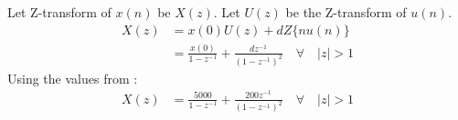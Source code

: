 \documentclass[journal,12pt,twocolumn]{IEEEtran}
\theoremstyle{remark}
\begin{document}
Let Z-transform of $x(n)$ be $X(z)$. Let $U(z)$ be the Z-transform of $u(n)$.
\begin{align}
X(z) &= x(0)U(z) + dZ\{nu(n)\} \\
&= \frac{x(0)}{1 - z^{-1}} + \frac{dz^{-1}}{(1 - z^{-1})^2} \quad \forall \quad |z| > 1
\end{align}
Using the values from :
\begin{align}
X(z) &= \frac{5000}{1 - z^{-1}} + \frac{200z^{-1}}{(1 - z^{-1})^2} \quad \forall \quad |z| > 1
\end{align}
\end{document}
